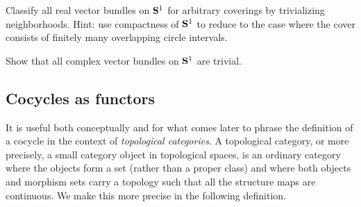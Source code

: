 \documentclass[a4paper,openany]{scrbook}
\begin{document}
\begin{exer} \label{exer:bundlesons1}
Classify all real vector bundles on $\S^1$ for arbitrary coverings by trivializing neighborhoods. Hint: use compactness of $\S^1$ to reduce to the case where the cover consists of finitely many overlapping circle intervals.
\end{exer}

\begin{exer} \label{exer:complexbundlesons1}
Show that all complex vector bundles on $\S^1$ are trivial.
\end{exer}

\subsection{Cocycles as functors} \label{subsec:cocyclesasfunctors}

It is useful both conceptually and for what comes later to phrase the definition of a cocycle in the context of \emph{topological categories}. A topological category, or more precisely, a small category object in topological spaces, is an ordinary category where the objects form a set (rather than a proper class) and where both objects and morphism sets carry a topology such that all the structure maps are continuous. We make this more precise in the following definition.
\end{document}
